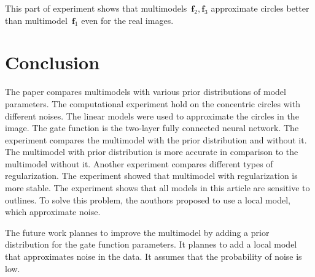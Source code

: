 \documentclass[12pt, twoside]{article}
\numberwithin{equation}{section}
\begin{document}
This part of experiment shows that multimodels~$\textbf{f}_2, \textbf{f}_3$ approximate circles better than multimodel~$\textbf{f}_1$ even for the real images.


\section{Conclusion}
The paper compares multimodels with various prior distributions of model parameters. 
The computational experiment hold on the concentric circles with different noises.
The linear models were used to approximate the circles in the image. The gate function is the two-layer fully connected neural network.
The experiment compares the multimodel with the prior distribution and without it. The multimodel with prior distribution is more accurate in comparison to the multimodel without it.
Another experiment compares different types of regularization. The experiment showed that multimodel with regularization is more stable.
The experiment shows that all models in this article are sensitive to outlines. To solve this problem, the aouthors proposed to use a local model, which approximate noise. 

The future work plannes to improve the multimodel by adding a prior distribution for the gate function parameters. It plannes to add a local model that approximates noise in the data. It assumes that the probability of noise is low.
\end{document}

